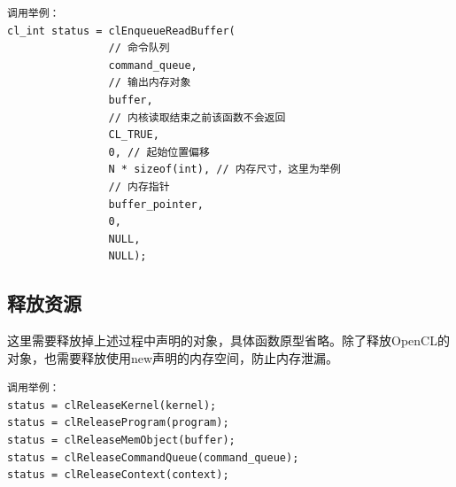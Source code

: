 \documentclass{ctexart}
\begin{document}
\begin{verbatim}
调用举例：
cl_int status = clEnqueueReadBuffer(
                // 命令队列
                command_queue,	
                // 输出内存对象	
                buffer,	
                // 内核读取结束之前该函数不会返回
                CL_TRUE,			
                0, // 起始位置偏移
                N * sizeof(int), // 内存尺寸，这里为举例
                // 内存指针
                buffer_pointer,
                0,
                NULL,
                NULL);
\end{verbatim}


\subsection{释放资源}
这里需要释放掉上述过程中声明的对象，具体函数原型省略。除了释放OpenCL的对象，也需要释放使用new声明的内存空间，防止内存泄漏。
\begin{verbatim}
调用举例：
status = clReleaseKernel(kernel);
status = clReleaseProgram(program);
status = clReleaseMemObject(buffer);
status = clReleaseCommandQueue(command_queue);
status = clReleaseContext(context);
\end{verbatim}


\newpage
\end{document}
